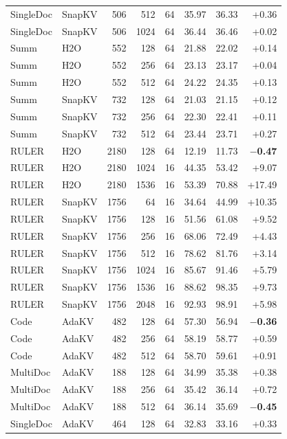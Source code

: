 \begin{table}[t]
\begin{tabular}{@{}l l r r r r r r@{}}
    SingleDoc & SnapKV & 506 & 512 & 64 & 35.97 & 36.33 & +0.36 \\
    SingleDoc & SnapKV & 506 & 1024 & 64 & 36.44 & 36.46 & +0.02 \\
    Summ & H2O & 552 & 128 & 64 & 21.88 & 22.02 & +0.14 \\
    Summ & H2O & 552 & 256 & 64 & 23.13 & 23.17 & +0.04 \\
    Summ & H2O & 552 & 512 & 64 & 24.22 & 24.35 & +0.13 \\
    Summ & SnapKV & 732 & 128 & 64 & 21.03 & 21.15 & +0.12 \\
    Summ & SnapKV & 732 & 256 & 64 & 22.30 & 22.41 & +0.11 \\
    Summ & SnapKV & 732 & 512 & 64 & 23.44 & 23.71 & +0.27 \\
    RULER & H2O & 2180 & 128 & 64 & 12.19 & 11.73 & \textbf{$-$0.47} \\
    RULER & H2O & 2180 & 1024 & 16 & 44.35 & 53.42 & +9.07 \\
    RULER & H2O & 2180 & 1536 & 16 & 53.39 & 70.88 & +17.49 \\
    RULER & SnapKV & 1756 & 64 & 16 & 34.64 & 44.99 & +10.35 \\
    RULER & SnapKV & 1756 & 128 & 16 & 51.56 & 61.08 & +9.52 \\
    RULER & SnapKV & 1756 & 256 & 16 & 68.06 & 72.49 & +4.43 \\
    RULER & SnapKV & 1756 & 512 & 16 & 78.62 & 81.76 & +3.14 \\
    RULER & SnapKV & 1756 & 1024 & 16 & 85.67 & 91.46 & +5.79 \\
    RULER & SnapKV & 1756 & 1536 & 16 & 88.62 & 98.35 & +9.73 \\
    RULER & SnapKV & 1756 & 2048 & 16 & 92.93 & 98.91 & +5.98 \\
    Code & AdaKV & 482 & 128 & 64 & 57.30 & 56.94 & \textbf{$-$0.36} \\
    Code & AdaKV & 482 & 256 & 64 & 58.19 & 58.77 & +0.59 \\
    Code & AdaKV & 482 & 512 & 64 & 58.70 & 59.61 & +0.91 \\
    MultiDoc & AdaKV & 188 & 128 & 64 & 34.99 & 35.38 & +0.38 \\
    MultiDoc & AdaKV & 188 & 256 & 64 & 35.42 & 36.14 & +0.72 \\
    MultiDoc & AdaKV & 188 & 512 & 64 & 36.14 & 35.69 & \textbf{$-$0.45} \\
    SingleDoc & AdaKV & 464 & 128 & 64 & 32.83 & 33.16 & +0.33 \\

\end{tabular}
\end{table}
